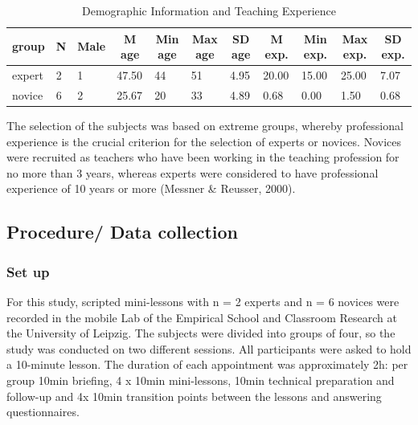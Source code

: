 \documentclass[
  english,
  man,floatsintext]{apa6}
\begin{document}
\begin{table}[h]

\begin{center}
\begin{threeparttable}

\caption{\label{tab:demographicspilottable}Demographic Information and Teaching Experience}

\small{

\begin{tabular}{lllllllllll}
\toprule
group & \multicolumn{1}{c}{N} & \multicolumn{1}{c}{Male} & \multicolumn{1}{c}{M age} & \multicolumn{1}{c}{Min age} & \multicolumn{1}{c}{Max age} & \multicolumn{1}{c}{SD age} & \multicolumn{1}{c}{M exp.} & \multicolumn{1}{c}{Min exp.} & \multicolumn{1}{c}{Max exp.} & \multicolumn{1}{c}{SD exp.}\\
\midrule
expert & 2 & 1 & 47.50 & 44 & 51 & 4.95 & 20.00 & 15.00 & 25.00 & 7.07\\
novice & 6 & 2 & 25.67 & 20 & 33 & 4.89 & 0.68 & 0.00 & 1.50 & 0.68\\
\bottomrule
\end{tabular}

}

\end{threeparttable}
\end{center}

\end{table}

The selection of the subjects was based on extreme groups, whereby professional experience is the crucial criterion for the selection of experts or novices. Novices were recruited as teachers who have been working in the teaching profession for no more than 3 years, whereas experts were considered to have professional experience of 10 years or more (Messner \& Reusser, 2000).

\hypertarget{procedure-data-collection}{%
\subsection{Procedure/ Data collection}\label{procedure-data-collection}}

\hypertarget{set-up}{%
\subsubsection{Set up}\label{set-up}}

For this study, scripted mini-lessons with n = 2 experts and n = 6 novices were recorded in the mobile Lab of the Empirical School and Classroom Research at the University of Leipzig. The subjects were divided into groups of four, so the study was conducted on two different sessions. All participants were asked to hold a 10-minute lesson. The duration of each appointment was approximately 2h: per group 10min briefing, 4 x 10min mini-lessons, 10min technical preparation and follow-up and 4x 10min transition points between the lessons and answering questionnaires.
\end{document}
